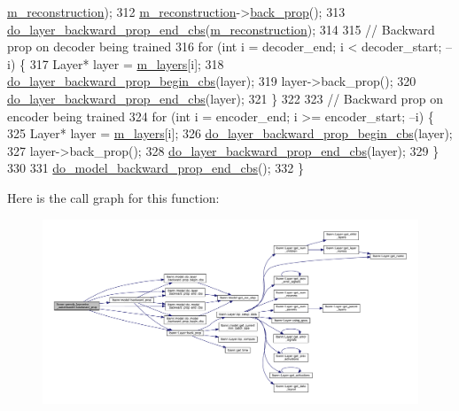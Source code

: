 \begin{DoxyCode}
      \hyperlink{classlbann_1_1greedy__layerwise__autoencoder_a8238d2e3e723543c8b6f7f5c61a9ca06}{m\_reconstruction});
312   \hyperlink{classlbann_1_1greedy__layerwise__autoencoder_a8238d2e3e723543c8b6f7f5c61a9ca06}{m\_reconstruction}->\hyperlink{classlbann_1_1Layer_a0a502d9218d7dbbfd10ebebb6f917033}{back\_prop}();
313   \hyperlink{classlbann_1_1model_ab0939d2668cca7efc2cc52355d34df3b}{do\_layer\_backward\_prop\_end\_cbs}(\hyperlink{classlbann_1_1greedy__layerwise__autoencoder_a8238d2e3e723543c8b6f7f5c61a9ca06}{m\_reconstruction});
314 
315   \textcolor{comment}{// Backward prop on decoder being trained}
316   \textcolor{keywordflow}{for} (\textcolor{keywordtype}{int} i = decoder\_end; i < decoder\_start; --i) \{
317     Layer* layer = \hyperlink{classlbann_1_1model_a0229fc226ec163d1411548446104569d}{m\_layers}[i];
318     \hyperlink{classlbann_1_1model_a51dc59ea8dd4bc689854732269aaf001}{do\_layer\_backward\_prop\_begin\_cbs}(layer);
319     layer->back\_prop();
320     \hyperlink{classlbann_1_1model_ab0939d2668cca7efc2cc52355d34df3b}{do\_layer\_backward\_prop\_end\_cbs}(layer);
321   \}
322 
323   \textcolor{comment}{// Backward prop on encoder being trained}
324   \textcolor{keywordflow}{for} (\textcolor{keywordtype}{int} i = encoder\_end; i >= encoder\_start; --i) \{
325     Layer* layer = \hyperlink{classlbann_1_1model_a0229fc226ec163d1411548446104569d}{m\_layers}[i];
326     \hyperlink{classlbann_1_1model_a51dc59ea8dd4bc689854732269aaf001}{do\_layer\_backward\_prop\_begin\_cbs}(layer);
327     layer->back\_prop();
328     \hyperlink{classlbann_1_1model_ab0939d2668cca7efc2cc52355d34df3b}{do\_layer\_backward\_prop\_end\_cbs}(layer);
329   \}
330 
331   \hyperlink{classlbann_1_1model_a737a0129eadf52be476034888b3eedc2}{do\_model\_backward\_prop\_end\_cbs}();
332 \}
\end{DoxyCode}
Here is the call graph for this function\+:\nopagebreak
\begin{figure}[H]
\begin{center}
\leavevmode
\includegraphics[width=350pt]{classlbann_1_1greedy__layerwise__autoencoder_a6d39fda041fe570a668cb72594508062_cgraph}
\end{center}
\end{figure}
\mbox{\label{classlbann_1_1greedy__layerwise__autoencoder_a435fa0830662ebde904b9e70902f7e16}} 
